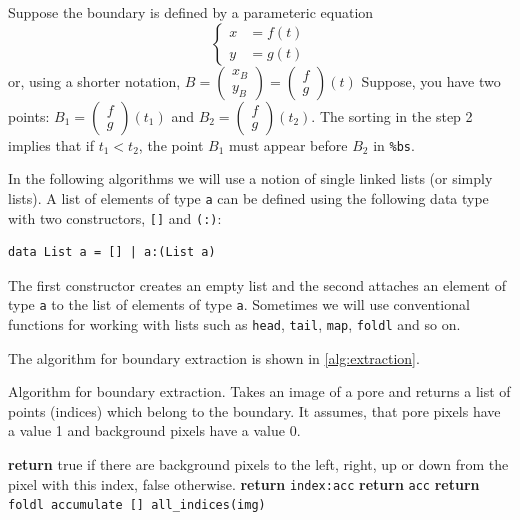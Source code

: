 \documentclass[reprint,amsmath,amssymb,aps,pre,showkeys,showpacs]{revtex4-1}
\begin{document}
Suppose the boundary is defined by a parameteric equation
\begin{equation*}
  \left\{
  \begin{aligned}
    x &= f(t) \\
    y &= g(t)
  \end{aligned}
  \right.
\end{equation*}
or, using a shorter notation,
$B = \begin{pmatrix} x_B \\ y_B \end{pmatrix} = \begin{pmatrix} f \\ g \end{pmatrix}(t)$
Suppose, you have two points: $B_1 = \begin{pmatrix} f \\ g \end{pmatrix}(t_1)$
and $B_2 = \begin{pmatrix} f \\ g \end{pmatrix}(t_2)$. The sorting in the step 2
implies that if $t_1 < t_2$, the point $B_1$ must appear before $B_2$ in
\texttt{\%bs}.

In the following algorithms we will use a notion of single linked lists (or
simply lists). A list of elements of type \texttt{a} can be defined using the
following data type with two constructors, \texttt{[]} and \texttt{(:)}:
\begin{verbatim}
data List a = [] | a:(List a)
\end{verbatim}
The first constructor creates an empty list and the second attaches an element
of type \texttt{a} to the list of elements of type \texttt{a}. Sometimes we will
use conventional functions for working with lists such as \texttt{head},
\texttt{tail}, \texttt{map}, \texttt{foldl} and so on.

The algorithm for boundary extraction is shown in \cref{alg:extraction}.
\begin{algorithm}[H]
  \caption{Algorithm for boundary extraction. Takes an image of a pore and
    returns a list of points (indices) which belong to the boundary. It assumes,
  that pore pixels have a value 1 and background pixels have a value 0.}
  \label{alg:extraction}
  \begin{algorithmic}[1]
    \State \textbf{return} true if there are background pixels to the left,
    right, up or down from the pixel with this index, false otherwise.
    \EndProcedure
    \State \textbf{return} \texttt{index:acc}
    \Else
    \State \textbf{return} \texttt{acc}
    \EndIf
    \EndProcedure
    \State \textbf{return} \texttt{foldl accumulate [] all\_indices(img)}
    \EndProcedure
  \end{algorithmic}
\end{algorithm}
\end{document}
